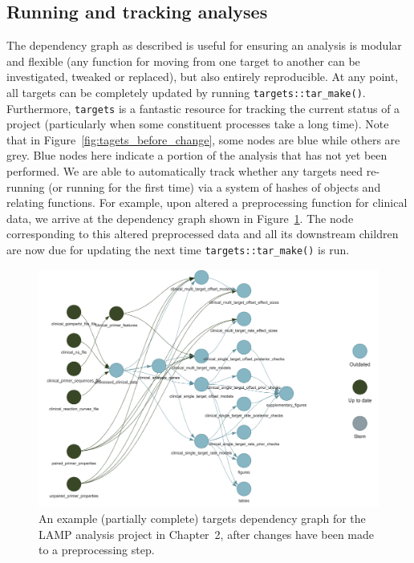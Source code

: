 \documentclass[../thesis.tex]{subfiles}
\begin{document}
\subsection{Running and tracking analyses}
The dependency graph as described is useful for ensuring an analysis is modular and flexible (any function for moving from one target to another can be investigated, tweaked or replaced), but also entirely reproducible. At any point, all targets can be completely updated by running \lstinline{targets::tar_make()}. Furthermore, \texttt{targets} is a fantastic resource for tracking the current status of a project (particularly when some constituent processes take a long time). Note that in Figure~\ref{fig:tagets_before_change}, some nodes are blue while others are grey. Blue nodes here indicate a portion of the analysis that has not yet been performed. We are able to automatically track whether any targets need re-running (or running for the first time) via a system of hashes of objects and relating functions. For example, upon altered a preprocessing function for clinical data, we arrive at the dependency graph shown in Figure~\ref{fig:tagets_after_change}. The node corresponding to this altered preprocessed data and all its downstream children are now due for updating the next time \lstinline{targets::tar_make()} is run.

\begin{figure}
    \centering
    \includegraphics[width=\textwidth]{figures/misc/targets_after_change.png}
    \caption{An example (partially complete) targets dependency graph for the LAMP analysis project in Chapter~2, after changes have been made to a preprocessing step.}
    \label{fig:tagets_after_change}
\end{figure}

\dobib %
 
\end{document}
